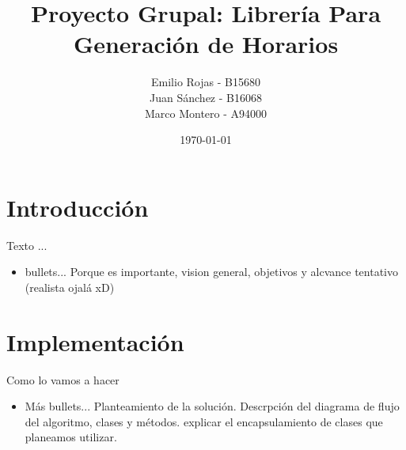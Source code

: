 \documentclass[10pt]{beamer}
\title{Proyecto Grupal: Librería Para Generación de Horarios}
\subtitle{}  %
\date{\today}
\author{
Emilio Rojas - B15680\\
  Juan Sánchez - B16068\\
  Marco Montero - A94000\\
  \href{mailto:}{{\tt}}
}
\institute[
  IE0217 - Estructuras de datos abstractas y algoritmos\\
  Escuela de Ingenieria Eléctrica\\
  Universidad de Costa Rica
] %
{%
  IE0217 - Estructuras de datos abstractas y algoritmos\\\
  Escuela de Ingenieria Eléctrica\\
  Universidad de Costa Rica

}
\begin{document}
\aauwavesbg

\begin{frame} %
\titlepage
\end{frame}


%









\section{Introducción}

\begin{frame}{Texto ...}{}
\begin{block}{}
  \begin{itemize}
  \item bullets... Porque es importante, vision general, objetivos y alcvance tentativo (realista ojalá xD)
  \end{itemize}


\end{block}
\end{frame}




\section{Implementación}
\begin{frame}{Como lo vamos a hacer}{}
\begin{block}{}

\begin{itemize}
\item Más bullets... Planteamiento de la solución. Descrpción del diagrama de flujo del algoritmo, clases y métodos. explicar el encapsulamiento de clases que planeamos utilizar.
\end{itemize}

\end{block}
\end{frame}
\end{document}

